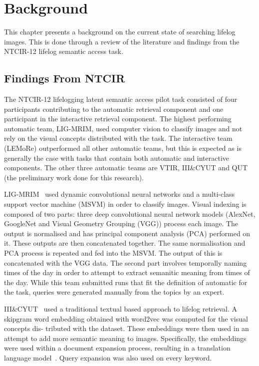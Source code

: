 \chapter{Background}

This chapter presents a background on the current state of searching lifelog images. This is done through a review of the literature and findings from the NTCIR-12 lifelog semantic access task.



\section{Findings From NTCIR}
The NTCIR-12 lifelogging latent semantic access pilot task consisted of four participants contributing to the automatic retrieval component and one participant in the interactive retrieval component. The highest performing automatic team, LIG-MRIM, used computer vision to classify images and not rely on the visual concepts distributed with the task. The interactive team (LEMoRe) outperformed all other automatic teams, but this is expected as is generally the case with tasks that contain both automatic and interactive components. The other three automatic teams are VTIR, III\&CYUT and QUT (the preliminary work done for this research).

LIG-MRIM~\cite{safadilig2016ligmrim} used dynamic convolutional neural networks and a multi-class support vector machine (MSVM) in order to classify images. Visual indexing is composed of two parts: three deep convolutional neural network models (AlexNet, GoogleNet and Visual Geometry Grouping (VGG)) process each image. The output is normalised and has principal component analysis (PCA) performed on it. These outputs are then concatenated together. The same normalisation and PCA process is repeated and fed into the MSVM. The output of this is concatenated with the VGG data. The second part involves temporally naming times of the day in order to attempt to extract semanitic meaning from times of the day. While this team submitted runs that fit the definition of automatic for the task, queries were generated manually from the topics by an expert.

III\&CYUT~\cite{lin2016image} used a traditional textual based approach to lifelog retrieval. A skipgram word embedding obtained with word2vec\cite{mikolov2013word2vec} was computed for the visual concepts dis- tributed with the dataset. These embeddings were then used in an attempt to add more semantic meaning to images. Specifically, the embeddings were used within a document expansion process, resulting in a translation language model~\cite{zuccon2015integrating}. Query expansion was also used on every keyword.

